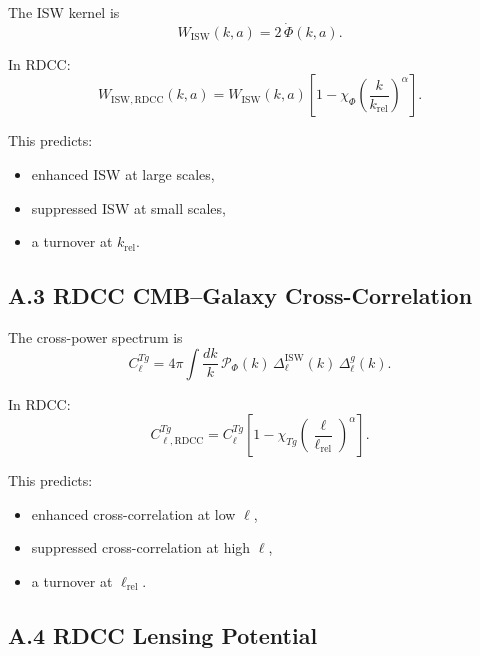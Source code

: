 \documentclass[11pt,a4paper]{article}
\begin{document}
The ISW kernel is
\begin{equation}
    W_{\mathrm{ISW}}(k,a)
    = 2\,\dot{\Phi}(k,a).
\end{equation}

In RDCC:
\begin{equation}
    W_{\mathrm{ISW,RDCC}}(k,a)
    = W_{\mathrm{ISW}}(k,a)
      \left[
        1 - \chi_{\Phi}
        \left(\frac{k}{k_{\mathrm{rel}}}\right)^{\alpha}
      \right].
\end{equation}

This predicts:

\begin{itemize}
    \item enhanced ISW at large scales,
    \item suppressed ISW at small scales,
    \item a turnover at $k_{\mathrm{rel}}$.
\end{itemize}

\subsection*{A.3 RDCC CMB–Galaxy Cross-Correlation}

The cross-power spectrum is
\begin{equation}
    C_{\ell}^{Tg}
    = 4\pi \int \frac{dk}{k}\,
      \mathcal{P}_{\Phi}(k)\,
      \Delta_{\ell}^{\mathrm{ISW}}(k)\,
      \Delta_{\ell}^{g}(k).
\end{equation}

In RDCC:
\begin{equation}
    C_{\ell,\mathrm{RDCC}}^{Tg}
    = C_{\ell}^{Tg}
      \left[
        1 - \chi_{Tg}
        \left(\frac{\ell}{\ell_{\mathrm{rel}}}\right)^{\alpha}
      \right].
\end{equation}

This predicts:

\begin{itemize}
    \item enhanced cross-correlation at low $\ell$,
    \item suppressed cross-correlation at high $\ell$,
    \item a turnover at $\ell_{\mathrm{rel}}$.
\end{itemize}

\subsection*{A.4 RDCC Lensing Potential}
\end{document}
